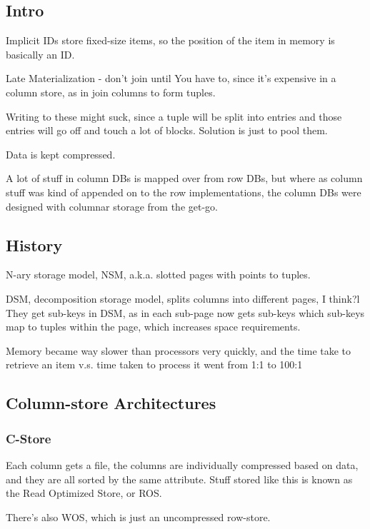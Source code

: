 \documentclass{article}
\begin{document}
	\subsection{Intro}
	
		Implicit IDs store fixed-size items, so the position of the item in memory is basically an ID.
		
		Late Materialization - don't join until You have to, since it's expensive in a column store, as in join columns to form tuples.
		
		Writing to these might suck, since a tuple will be split into entries and those entries will go off and touch a lot of blocks. Solution is just to pool them.
		
		Data is kept compressed.
		
		A lot of stuff in column DBs is mapped over from row DBs, but where as column stuff was kind of appended on to the row implementations, the column DBs were designed with columnar storage from the get-go.
		
	\subsection{History}
	
		N-ary storage model, NSM, a.k.a. slotted pages with points to tuples.
		
		DSM, decomposition storage model, splits columns into different pages, I think?l They get sub-keys in DSM, as in each sub-page now gets sub-keys which sub-keys map to tuples within the page, which increases space requirements.
		
		Memory became way slower than processors very quickly, and the time take to retrieve an item v.s. time taken to process it went from 1:1 to 100:1
	
	\subsection{Column-store Architectures}
	
		\subsubsection{C-Store}
		
			Each column gets a file, the columns are individually compressed based on data, and they are all sorted by the same attribute. Stuff stored like this is known as the Read Optimized Store, or ROS.
			
			There's also WOS, which is just an uncompressed row-store.
			
\end{document}
